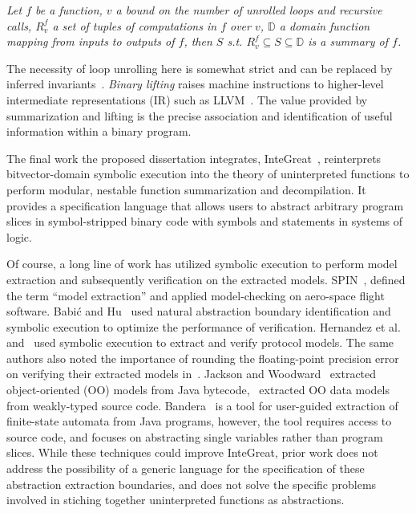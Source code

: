 \emph{Let $f$ be a function, $v$ a bound on the number of unrolled loops and recursive calls, $R_{v}^{f}$ a set of tuples of computations in $f$ over $v$, $\mathbb{D}$ a domain function mapping from inputs to outputs of $f$, then $S$ s.t. $R_{v}^{f} \subseteq S \subseteq \mathbb{D}$ is a summary of $f$.}

The necessity of loop unrolling here is somewhat strict and can be replaced by inferred invariants~\cite{furia2014loop}.
\emph{Binary lifting} raises machine instructions to higher-level intermediate representations (IR) such as LLVM~\cite{anand2013compiler,di2017rev,dinaburg2014mcsema}.
The value provided by summarization and lifting is the precise association and identification of useful information within a binary program.

The final work the proposed dissertation integrates, InteGreat~\cite{bland2023integreat}, reinterprets bitvector-domain symbolic execution into the theory of uninterpreted functions to perform modular, nestable function summarization and decompilation.
It provides a specification language that allows users to abstract arbitrary program slices in symbol-stripped binary code with symbols and statements in systems of logic.

Of course, a long line of work has utilized symbolic execution to perform model extraction and subsequently verification on the extracted models.
SPIN~\cite{spin}, defined the term ``model extraction'' and applied model-checking on aero-space flight software.
Babi\'c and Hu~\cite{babic2007structural} used natural abstraction boundary identification and symbolic execution to optimize the performance of verification.
Hernandez et al.~\cite{firmusb} and~\cite{cryto-symex} used symbolic execution to extract and verify protocol models.
The same authors also noted the importance of rounding the floating-point precision error on verifying their extracted models in~\cite{precision}.
Jackson and Woodward~\cite{lightweight-oo} extracted object-oriented (OO) models from Java bytecode,~\cite{oo-model} extracted OO data models from weakly-typed source code. 
Bandera~\cite{tool-supported-program-abstraction} is a tool for user-guided extraction of finite-state automata from Java programs, however, the tool requires access to source code, and focuses on abstracting single variables rather than program slices.
While these techniques could improve InteGreat, prior work does not address the possibility of a generic language for the specification of these abstraction extraction boundaries, and does not solve the specific problems involved in stiching together uninterpreted functions as abstractions.

